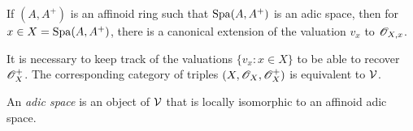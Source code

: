 \documentclass{article}
\begin{document}
If $(A,A^+)$ is an affinoid ring such that $\operatorname{Spa}(A,A^+)$ is an adic space, 
then for $x\in X=\operatorname{Spa}(A,A^+)$, there is a canonical extension of the valuation 
$v_x$ to $\mathscr{O}_{X,x}$. 

It is necessary to keep track of the valuations $\{v_x:x\in X\}$ to be able to 
recover $\mathscr{O}_X^+$. The corresponding category of triples $(X,\mathscr{O}_X,\mathscr{O}_X^+)$ 
is equivalent to $\mathcal{V}$. 

\begin{definition}
An \emph{adic space} is an object of $\mathcal{V}$ that is locally isomorphic to an 
affinoid adic space. 
\end{definition}
\end{document}
